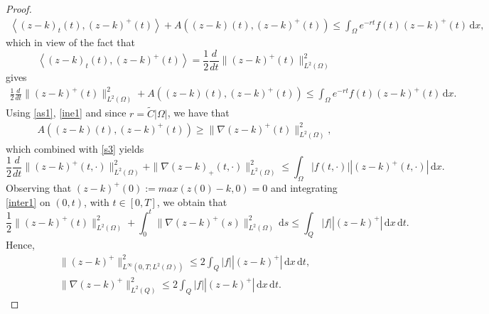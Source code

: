 \documentclass[reqno,twoside]{amsart}
\numberwithin{equation}{section}
\theoremstyle{definition}
\numberwithin{equation}{section}
\def \dis {\displaystyle}
\def \dx{\mathrm{d}x}
\def \ds{\mathrm{d}s}
\def \dq {\mathrm{d}x \, \mathrm{d}t}
\begin{document}
\begin{proof}
$$\begin{array}{lll}
		\left\langle (z-k)_t(t),(z-k)^+(t)\right\rangle+\dis A((z-k)(t), (z-k)^+(t))\leq \int_{\Omega}e^{-rt}f(t)(z-k)^+(t)\,\dx,
	\end{array}
	$$
	which in view of the fact that
	$$
	\dis \left\langle (z-k)_t(t),(z-k)^+(t)\right\rangle=\frac{1}{2}\frac{d}{dt}\|(z-k)^+(t)\|^2_{L^2(\Omega)}
	$$
	gives
	\begin{equation}\label{s3}
		\begin{array}{lll}
			\dis 	\frac{1}{2}\frac{d}{dt}\|(z-k)^+(t)\|^2_{L^2(\Omega)}+\dis A((z-k)(t), (z-k)^+(t))\leq \int_{\Omega}e^{-rt}f(t)(z-k)^+(t)\,\dx.
		\end{array}
	\end{equation}
	Using \eqref{as1}, \eqref{ine1} and since $r=\tilde{C}|\Omega|$, we have that
	$$
	\begin{array}{lll}
		\dis A((z-k)(t), (z-k)^+(t))
		\geq\dis  \|\nabla(z-k)^+(t)\|^2_{L^2(\Omega)},
	\end{array}
	$$
	which combined with \eqref{s3} yields
	\begin{equation}\label{inter1}
		\frac{1}{2}\frac{d}{dt}\|(z-k)^+(t,\cdot)\|^2_{L^2(\Omega)}+\|\nabla(z-k)_+(t,\cdot)\|^2_{L^2(\Omega)}\leq \int_{\Omega}|f(t,\cdot)||(z-k)^+(t,\cdot)|\,\dx.
	\end{equation}
	Observing that $(z-k)^+(0):=max(z(0)-k,0)=0$ and  integrating  \eqref{inter1} on $(0,t)$, with $t\in [0,T]$, we obtain that
	\begin{equation}
		\frac{1}{2}\|(z-k)^+(t)\|^2_{L^2(\Omega)}+\int_{0}^{t}\|\nabla(z-k)^+(s)\|^2_{L^2(\Omega)}\,\ds\leq \int_{Q}|f||(z-k)^+|\,\dq.
	\end{equation}
	Hence,
	\begin{subequations}
		\begin{alignat}{11}
			\dis \|(z-k)^+\|^2_{L^\infty (0,T;L^2(\Omega))}\leq  2 \int_{Q}|f||(z-k)^+|\,\dq,\label{inter200}\\
			\|\nabla(z-k)^+\|^2_{L^2(Q)}\leq 2 \int_{Q}|f||(z-k)^+|\,\dq.\label{inter3}
		\end{alignat}
	\end{subequations}
	

\end{proof}
\end{document}
